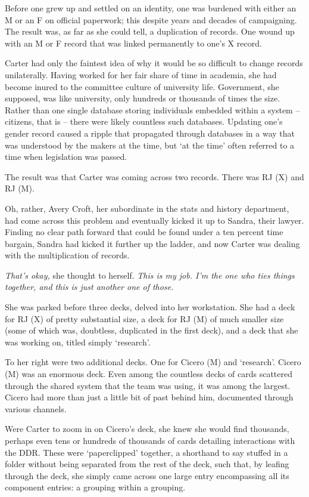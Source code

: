 Before one grew up and settled on an identity, one was burdened with either an M or an F on official paperwork; this despite years and decades of campaigning.  The result was, as far as she could tell, a duplication of records.  One wound up with an M or F record that was linked permanently to one's X record.

Carter had only the faintest idea of why it would be so difficult to change records unilaterally.  Having worked for her fair share of time in academia, she had become inured to the committee culture of university life.  Government, she supposed, was like university, only hundreds or thousands of times the size.  Rather than one single database storing individuals embedded within a system -- citizens, that is -- there were likely countless such databases.  Updating one's gender record caused a ripple that propagated through databases in a way that was understood by the makers at the time, but `at the time' often referred to a time when legislation was passed.

The result was that Carter was coming across two records.  There was RJ (X) and RJ (M).

Oh, rather, Avery Croft, her subordinate in the stats and history department, had come across this problem and eventually kicked it up to Sandra, their lawyer.  Finding no clear path forward that could be found under a ten percent time bargain, Sandra had kicked it further up the ladder, and now Carter was dealing with the multiplication of records.

\textit{That's okay,} she thought to herself.  \textit{This is my job.  I'm the one who ties things together, and this is just another one of those.}

She was parked before three decks, delved into her workstation.  She had a deck for RJ (X) of pretty substantial size, a deck for RJ (M) of much smaller size (some of which was, doubtless, duplicated in the first deck), and a deck that she was working on, titled simply `research'.

To her right were two additional decks.  One for Cicero (M) and `research'.  Cicero (M) was an enormous deck.  Even among the countless decks of cards scattered through the shared system that the team was using, it was among the largest.  Cicero had more than just a little bit of past behind him, documented through various channels.

Were Carter to zoom in on Cicero's deck, she knew she would find thousands, perhaps even tens or hundreds of thousands of cards detailing interactions with the DDR.  These were `paperclipped' together, a shorthand to say stuffed in a folder without being separated from the rest of the deck, such that, by leafing through the deck, she simply came across one large entry encompassing all its component entries: a grouping within a grouping.

